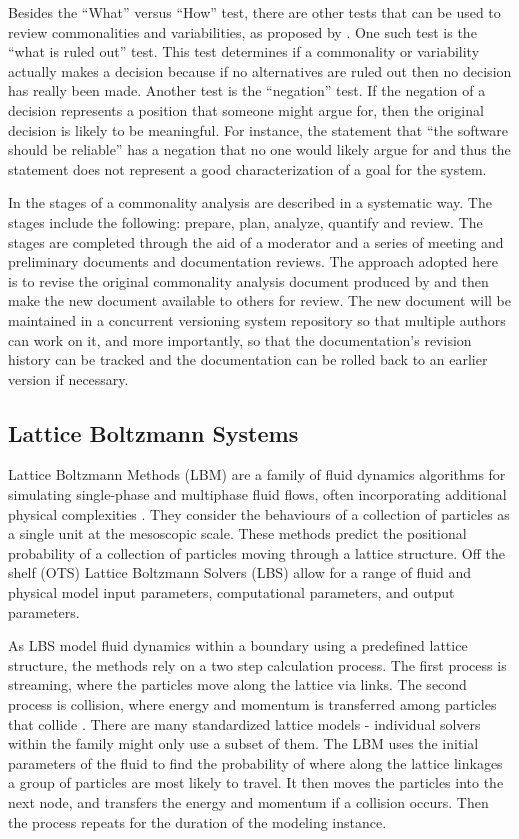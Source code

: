 \documentclass[12pt]{article}
\begin{document}
Besides the “What” versus “How” test, there are other tests that can be used to review commonalities and variabilities, as proposed by \cite{weiss1997defining}. One such test is the “what is ruled out” test. This test determines if a commonality or variability actually makes a decision because if no alternatives are ruled out then no decision has really been made. Another test is the “negation” test. If the negation of a decision represents a position that someone might argue for, then the original decision is likely to be meaningful. For instance, the statement that “the software should be reliable” has a negation that no one would likely argue for and thus the statement does not represent a good characterization of a goal for the system. 

In \cite{weiss1997defining} the stages of a commonality analysis are described in a systematic way. The stages include the following: prepare, plan, analyze, quantify and review. The stages are completed through the aid of a moderator and a series of meeting and preliminary documents and documentation reviews. The approach adopted here is to revise the original commonality analysis document produced by \cite{chen2003} and then make the new document available to others for review. The new document will be maintained in a concurrent versioning system repository so that multiple authors can work on it, and more importantly, so that the documentation’s revision history can be tracked and the documentation can be rolled back to an earlier version if necessary.

\subsection{Lattice Boltzmann Systems}
Lattice Boltzmann Methods (LBM) are a family of fluid dynamics algorithms for simulating single-phase and multiphase fluid flows, often incorporating additional physical complexities \citep{chen1998lattice}. They consider the behaviours of a collection of particles as a single unit at the mesoscopic scale. These methods predict the positional probability of a collection of particles moving through a lattice structure. Off the shelf (OTS) Lattice Boltzmann Solvers (LBS) allow for a range of fluid and physical model input parameters, computational parameters, and output parameters.

As LBS model fluid dynamics within a boundary using a predefined lattice structure, the methods rely on a two step calculation process. The first process is streaming, where the particles move along the lattice via links. The second process is collision, where energy and momentum is transferred among particles that collide \citep{bao2011lattice}.
There are many standardized lattice models - individual solvers within the family might only use a subset of them.
The LBM uses the initial parameters of the fluid to find the probability of where along the lattice linkages a group of particles are most likely to travel. It then moves the particles into the next node, and transfers the energy and momentum if a collision occurs. Then the process repeats for the duration of the modeling instance.\\
\end{document}
